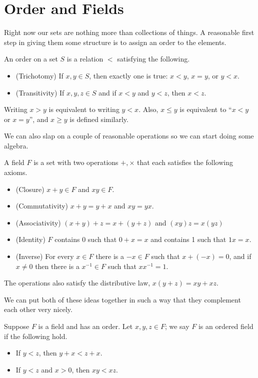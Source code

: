 \documentclass[../m131main.tex]{subfiles}
\begin{document}
\section{Order and Fields}
Right now our sets are nothing more than collections of things.
A reasonable first step in giving them some structure is to assign an order to the elements.

\begin{definition}[Order]
    An order on a set $S$ is a relation $<$ satisfying the following.
    \begin{itemize}
        \item (Trichotomy) If $x,y \in S$, then exactly one is true: $x < y$, $x = y$, or $y < x$.
        \item (Transitivity) If $x,y,z \in S$ and if $x < y$ and $y < z$, then $x < z$.
    \end{itemize}
    Writing $x > y$ is equivalent to writing $y < x$.
    Also, $x \leq y$ is equivalent to ``$x < y$ or $x = y$'', and $x \geq y$ is defined similarly.
\end{definition}

We can also slap on a couple of reasonable operations so we can start doing some algebra.

\begin{definition}[Field]
    A field $F$ is a set with two operations $+,\times$ that each satisfies the following axioms.
    \begin{itemize}
        \item (Closure) $x + y \in F$ and $xy \in F$.
        \item (Commutativity) $x + y = y + x$ and $xy = yx$.
        \item (Associativity) $(x + y) + z = x + (y + z)$ and $(xy)z = x(yz)$
        \item (Identity) $F$ contains 0 such that $0 + x = x$ and contains 1 such that $1x = x$.
        \item (Inverse) For every $x \in F$ there is a $-x \in F$ such that $x + (-x) = 0$, and if $x \neq 0$ then there is a $x^{-1} \in F$ such that $x x^{-1} = 1$.
    \end{itemize}
    The operations also satisfy the distributive law, $x(y + z) = xy + xz$.
\end{definition}

We can put both of these ideas together in such a way that they complement each other very nicely.

\begin{definition}
    Suppose $F$ is a field and has an order.
    Let $x,y,z \in F$;
    we say $F$ is an ordered field if the following hold.
    \begin{itemize}
        \item If $y < z$, then $y + x < z + x$.
        \item If $y < z$ and $x > 0$, then $xy < xz$.   
    \end{itemize}
\end{definition}
\end{document}
